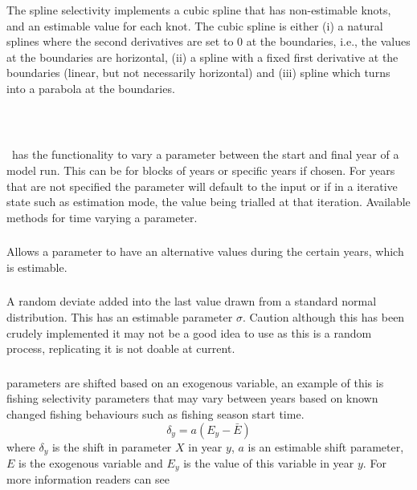 \subsubsection[Spline]{}

The spline selectivity implements a cubic spline that has non-estimable knots, and an estimable value for each knot. The cubic spline is either (i) a natural splines where the second derivatives are set to 0 at the boundaries, i.e., the values at the boundaries are horizontal, (ii) a spline with a fixed first derivative at the boundaries (linear, but not necessarily horizontal) and (iii) spline which turns into a parabola at the boundaries.

\


\subsection{\label{sec:time_var}}

\CNAME\ has the functionality to vary a parameter between the start and final year of a model run. This can be for blocks of years or specific years if chosen. For years that are not specified the parameter will default to the input or if in a iterative state such as estimation mode, the value being trialled at that iteration. Available methods for time varying a parameter.


\subsubsection[Constant]{}
Allows a parameter to have an alternative values during the certain years, which is estimable.

\subsubsection[Random Walk]{}
A random deviate added into the last value drawn from a standard normal distribution. This has an estimable parameter $\sigma$. Caution although this has been crudely implemented it may not be a good idea to use as this is a random process, replicating it is not doable at current.

\subsubsection[Exogenous]{}
parameters are shifted based on an exogenous variable, an example of this is fishing selectivity parameters that may vary between years based on known changed fishing behaviours such as fishing season start time.
\begin{equation}
\delta_y = a(E_y - \bar{E})
\end{equation}
where $\delta_y$ is the shift in parameter $X$ in year $y$, $a$ is an estimable shift parameter, $E$ is the exogenous variable and $E_y$ is the value of this variable in year $y$. For more information readers can see \cite{francis_03}

